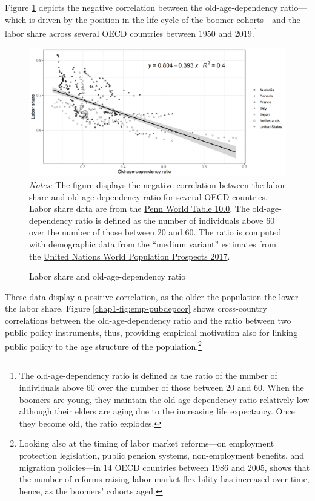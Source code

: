 Figure \ref{chap1-fig:emp-lsdepcor} depicts the negative correlation between the old-age-dependency ratio---which is driven by the position in the life cycle of the boomer cohorts---and the labor share across several OECD countries between 1950 and 2019.\footnote{The old-age-dependency ratio is defined as the ratio of the number of individuals above 60 over the number of those between 20 and 60. When the boomers are young, they maintain the old-age-dependency ratio relatively low although their elders are aging due to the increasing life expectancy. Once they become old, the ratio explodes.}
\begin{figure}[!tb]
	\centering
	\caption{Labor share and old-age-dependency ratio}\label{chap1-fig:emp-lsdepcor}
	\includegraphics[width=\linewidth]{chap1/graphic/emp-lsdepcor.png}
	\vspace{-3em}
	\justify\singlespacing\footnotesize\textit{Notes:} The figure displays the negative correlation between the labor share and old-age-dependency ratio for several OECD countries. Labor share data are from the \href{https://www.rug.nl/ggdc/productivity/pwt/}{Penn World Table 10.0}. The old-age-dependency ratio is defined as the number of individuals above 60 over the number of those between 20 and 60. The ratio is computed with demographic data from the ``medium variant'' estimates from the \href{https://population.un.org/wpp/}{United Nations World Population Prospects 2017}.
\end{figure}
These data display a positive correlation, as the older the population the lower the labor share. 
Figure \ref{chap1-fig:emp-pubdepcor} shows cross-country correlations between the old-age-dependency ratio and the ratio between two public policy instruments, thus, providing empirical motivation also for linking public policy to the age structure of the population.\footnote{Looking also at the timing of labor market reforms---on employment protection legislation, public pension systems, non-employment benefits, and migration policies---in 14 OECD countries between 1986 and 2005, \citet{Pica2010Capital} shows that the number of reforms raising labor market flexibility has increased over time, hence, as the boomers' cohorts aged.}
